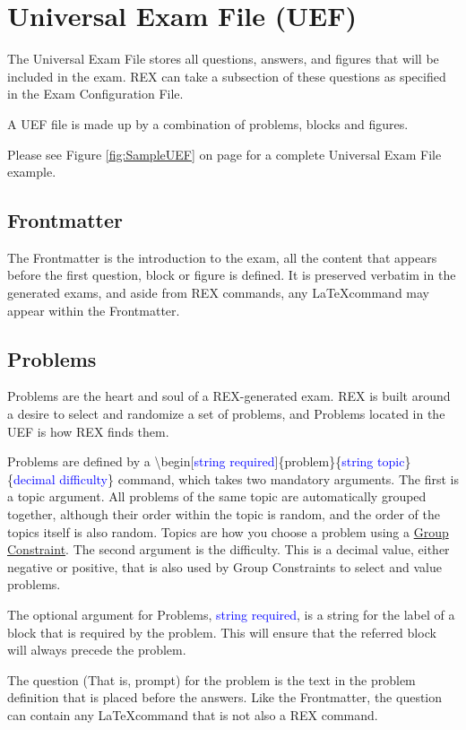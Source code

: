 \documentclass{article}
\begin{document}
\section{Universal Exam File (UEF)}
The Universal Exam File stores all questions, answers, and figures that will be
included in the exam. REX can take a subsection of these questions as specified
in the Exam Configuration File. 

A UEF file is made up by a combination of problems, blocks and figures.

Please see Figure \ref{fig:SampleUEF} on page \pageref{fig:SampleUEF} for 
a complete Universal Exam File example.

\subsection{Frontmatter}
The Frontmatter is the introduction to the exam, all the content that appears before the first question, block or figure is defined. It is preserved verbatim in the generated exams, and aside from REX commands, any \LaTeX command may appear within the Frontmatter.

\subsection{Problems}
Problems are the heart and soul of a REX-generated exam. REX is built around a desire to select and randomize a set of problems, and Problems located in the UEF is how REX finds them.

Problems are defined by a \textbackslash{begin}[\textcolor{blue}{string required}]\{problem\}\{\textcolor{blue}{string topic}\}\{\textcolor{blue}{decimal difficulty}\} command, which takes two mandatory arguments. The first is a topic argument. All problems of the same topic are automatically grouped together, although their order within the topic is random, and the order of the topics itself is also random. Topics are how you choose a problem using a \hyperref[GroupConstraints]{Group Constraint}. The second argument is the difficulty. This is a decimal value, either negative or positive, that is also used by Group Constraints to select and value problems.

The optional argument for Problems, \textcolor{blue}{string required}, is a string for the label of a block that is required by the problem. This will ensure that the referred block will always precede the problem.

The question (That is, prompt) for the problem is the text in the problem definition that is placed before the answers. Like the Frontmatter, the question can contain any \LaTeX command that is not also a REX command.
\end{document}
